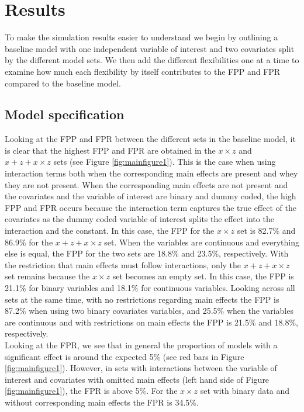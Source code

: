 \section{Results} 
To make the simulation results easier to understand we begin by outlining a baseline model with one independent  variable of interest and two covariates split by the different model sets. We then add the different flexibilities one at a time to examine how much each flexibility by itself contributes to the FPP and FPR compared to the baseline model.

\subsection{Model specification}
Looking at the FPP and FPR between the different sets in the baseline model, it is clear that the highest FPP and FPR are obtained in the $x \times z$ and $x + z+ x \times z$ sets (see Figure \ref{fig:mainfigure1}). This is the case when using interaction terms both when the corresponding main effects are present and whey they are not present. When the corresponding main effects are not present and the covariates and the variable of interest are binary and dummy coded, the high FPP and FPR occurs because the interaction term  captures the true effect of the covariates as the dummy coded variable of interest splits the effect into the interaction and the constant. In this case, the FPP for the $x \times z$ set is 82.7\% and 86.9\% for the $x + z+ x \times z$ set. When the variables are continuous and everything else is equal, the FPP for the two sets are 18.8\% and 23.5\%, respectively. With the restriction that main effects must follow interactions, only the $x + z+ x \times z$ set remains because the $x \times z$ set becomes an empty set. In this case, the FPP is 21.1\% for binary variables and 18.1\% for continuous variables. Looking across all sets at the same time, with no restrictions regarding main effects the FPP is 87.2\% when using two binary covariates variables, and 25.5\% when the variables are continuous and with restrictions on main effects the FPP is 21.5\% and 18.8\%, respectively.\\ 
Looking at the FPR, we see that in general the proportion of models with a significant effect is around the expected 5\%  (see red bars in Figure \ref{fig:mainfigure1}). However, in sets with interactions between the variable of interest and covariates with omitted main effects (left hand side of Figure \ref{fig:mainfigure1}), the FPR is above 5\%. For the $x \times z$ set with binary data and without corresponding main effects the FPR is 34.5\%. \\

